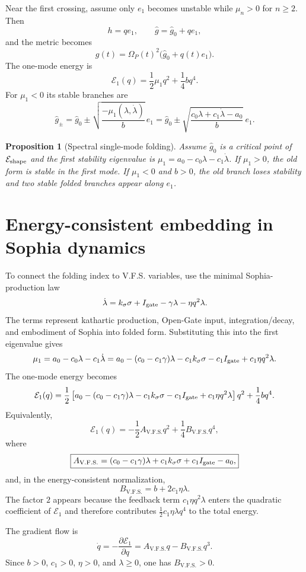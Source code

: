 \documentclass[11pt,a4paper]{article}
\newcommand{\VFS}{\ensuremath{\mathrm{V.F.S.}}}
\newcommand{\Op}{\Omega_P}
\newcommand{\Igate}{I_{\rm gate}}
\theoremstyle{plain}
\newtheorem{proposition}{Proposition}
\theoremstyle{remark}
\theoremstyle{definition}
\begin{document}
Near the first crossing, assume only $e_1$ becomes unstable while $\mu_n>0$ for $n\ge2$.
Then
\[
h=q e_1,
\qquad
\widehat g=\widehat g_0+q e_1,
\]
and the metric becomes
\[
\boxed{
g(t)=\Op(t)^2\bigl(\widehat g_0+q(t)e_1\bigr).
}
\]
The one-mode energy is
\[
\mathcal E_1(q)
=
\frac12\mu_1 q^2+\frac14bq^4.
\]
For $\mu_1<0$ its stable branches are
\[
\boxed{
\widehat g_\pm
=
\widehat g_0
\pm
\sqrt{\frac{-\mu_1(\lambda,\dot\lambda)}{b}}\,e_1
=
\widehat g_0
\pm
\sqrt{\frac{c_0\lambda+c_1\dot\lambda-a_0}{b}}\,e_1.
}
\]

\begin{proposition}[Spectral single-mode folding]
Assume $\widehat g_0$ is a critical point of $\mathcal E_{\rm shape}$ and the first stability
eigenvalue is $\mu_1=a_0-c_0\lambda-c_1\dot\lambda$. If $\mu_1>0$, the old form is stable in the
first mode. If $\mu_1<0$ and $b>0$, the old branch loses stability and two stable folded branches
appear along $e_1$.
\end{proposition}

\section{Energy-consistent embedding in Sophia dynamics}
To connect the folding index to V.F.S. variables, use the minimal Sophia-production law
\[
\dot\lambda=k_\sigma\sigma+
\Igate-
\gamma\lambda-
\eta q^2\lambda.
\]
The terms represent kathartic production, Open-Gate input, integration/decay, and embodiment of Sophia
into folded form. Substituting this into the first eigenvalue gives
\[
\mu_1
=
a_0-c_0\lambda-c_1\dot\lambda
=
a_0
-(c_0-c_1\gamma)\lambda
-c_1k_\sigma\sigma
-c_1\Igate
+c_1\eta q^2\lambda.
\]
The one-mode energy becomes
\[
\mathcal E_1(q)
=
\frac12
\left[
a_0
-(c_0-c_1\gamma)\lambda
-c_1k_\sigma\sigma
-c_1\Igate
+c_1\eta q^2\lambda
\right]q^2
+
\frac14bq^4.
\]
Equivalently,
\[
\boxed{
\mathcal E_1(q)
=
-\frac12A_{\VFS}q^2+
\frac14B_{\VFS}q^4,
}
\]
where
\[
\boxed{
A_{\VFS}=(c_0-c_1\gamma)\lambda+c_1k_\sigma\sigma+c_1\Igate-a_0,
}
\]
and, in the energy-consistent normalization,
\[
\boxed{
B_{\VFS}=b+2c_1\eta\lambda.
}
\]
The factor $2$ appears because the feedback term $c_1\eta q^2\lambda$ enters the quadratic coefficient
of $\mathcal E_1$ and therefore contributes $\frac12c_1\eta\lambda q^4$ to the total energy.

The gradient flow is
\[
\dot q=-\frac{\partial\mathcal E_1}{\partial q}
=A_{\VFS}q-B_{\VFS}q^3.
\]
Since $b>0$, $c_1>0$, $\eta>0$, and $\lambda\ge0$, one has $B_{\VFS}>0$.
\end{document}
